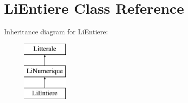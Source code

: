 \hypertarget{class_li_entiere}{}\section{Li\+Entiere Class Reference}
\label{class_li_entiere}
Inheritance diagram for Li\+Entiere\+:\begin{figure}[H]
\begin{center}
\leavevmode
\includegraphics[height=3.000000cm]{class_li_entiere}
\end{center}
\end{figure}
